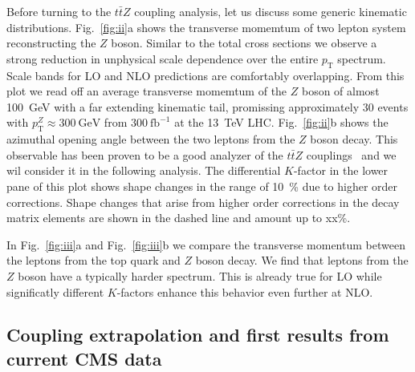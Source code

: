 \documentclass[preprint]{JHEP3} %
\newcommand{\GeV}{\mathrm{GeV}}
\newcommand{\pT}{p_{\mathrm{T}}}
\def\ttbZ{t\bar{t}Z}
\begin{document}
Before turning to the $\ttbZ$ coupling analysis, let us discuss some generic kinematic distributions.
Fig.~\ref{fig:ii}a shows the transverse momemtum of two lepton system reconstructing the $Z$ boson.
Similar to the total cross sections we observe a strong reduction in unphysical scale dependence over the entire $\pT$ spectrum.
Scale bands for LO and NLO predictions are comfortably overlapping. 
From this plot we read off an average transverse momemtum of the $Z$ boson of almost 100~GeV with a far extending kinematic tail,
promissing approximately 30 events with $\pT^Z \approx 300~\GeV$ from $300~\mathrm{fb}^{-1}$ at the 13~TeV LHC. 
Fig.~\ref{fig:ii}b shows the azimuthal opening angle between the two leptons from the $Z$ boson decay.
This observable has been proven to be a good analyzer of the $\ttbZ$ couplings~\cite{Baur:2004uw} and we wil consider it in the following analysis.
The differential $K$-factor in the lower pane of this plot shows shape changes in the range of 10~\% due to higher order corrections.
Shape changes that arise from higher order corrections in the decay matrix elements are shown in the dashed line and amount up to xx\%.



In Fig.~\ref{fig:iii}a and Fig.~\ref{fig:iii}b we compare the transverse momentum between the leptons from the top quark and $Z$ boson decay.
We find that leptons from the $Z$ boson have a typically harder spectrum. 
This is already true for LO while significatly different $K$-factors enhance this behavior even further at NLO.

\subsection{Coupling extrapolation and first results from current CMS data}
\label{sect:CMS}
\end{document}
